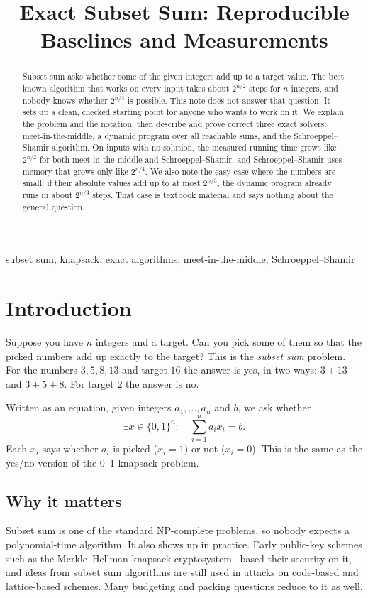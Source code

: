 \documentclass[conference]{IEEEtran}
\title{Exact Subset Sum: Reproducible Baselines and Measurements}
\author{\IEEEauthorblockN{Le Duc Minh}
\IEEEauthorblockA{\href{mailto:minh.leduc.0210@gmail.com}{minh.leduc.0210@gmail.com}}}
\begin{document}
\maketitle
\begin{abstract}
Subset sum asks whether some of the given integers add up to a target value.
The best known algorithm that works on every input takes about $2^{n/2}$ steps
for $n$ integers, and nobody knows whether $2^{n/3}$ is possible. This note
does not answer that question. It sets up a clean, checked starting point for
anyone who wants to work on it. We explain the problem and the notation, then
describe and prove correct three exact solvers: meet-in-the-middle, a
dynamic program over all reachable sums, and the Schroeppel--Shamir algorithm.
On inputs with no
solution, the measured running time grows like $2^{n/2}$ for both
meet-in-the-middle and Schroeppel--Shamir, and Schroeppel--Shamir uses memory
that grows only like $2^{n/4}$. We also note the easy case where the numbers
are small: if their absolute values add up to at most $2^{n/3}$, the dynamic
program already runs in about $2^{n/3}$ steps. That case is textbook material
and says nothing about the general question.
\end{abstract}
\begin{IEEEkeywords}
subset sum, knapsack, exact algorithms, meet-in-the-middle, Schroeppel--Shamir
\end{IEEEkeywords}

\section{Introduction}
Suppose you have $n$ integers and a target. Can you pick some of them so that
the picked numbers add up exactly to the target? This is the \emph{subset sum}
problem. For the numbers $3,5,8,13$ and target $16$ the answer is yes, in two
ways: $3+13$ and $3+5+8$. For target $2$ the answer is no.

Written as an equation, given integers $a_1,\dots,a_n$ and $b$, we ask whether
\begin{equation}\label{eq:problem}
\exists x\in\{0,1\}^n:\quad\sum_{i=1}^{n}a_i x_i=b.
\end{equation}
Each $x_i$ says whether $a_i$ is picked ($x_i=1$) or not ($x_i=0$). This is the
same as the yes/no version of the 0--1 knapsack problem.

\subsection{Why it matters}
Subset sum is one of the standard NP-complete problems, so nobody expects a
polynomial-time algorithm. It also shows up in practice. Early public-key
schemes such as the Merkle--Hellman knapsack cryptosystem~\cite{mh} based
their security on it, and ideas from subset sum algorithms are still used in
attacks on code-based and lattice-based schemes. Many budgeting and packing
questions reduce to it as well.
\end{document}
